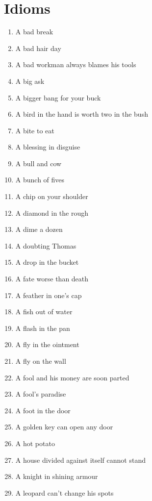 \chapter*{Idioms}


    \begin{enumerate}
        \item  A bad break
        \item  A bad hair day
        \item  A bad workman always blames his tools
        \item  A big ask
        \item  A bigger bang for your buck
        \item  A bird in the hand is worth two in the bush
        \item  A bite to eat
        \item  A blessing in disguise
        \item  A bull and cow
        \item  A bunch of fives
        \item  A chip on your shoulder
        \item  A diamond in the rough
        \item  A dime a dozen
        \item  A doubting Thomas
        \item  A drop in the bucket
        \item  A fate worse than death
        \item  A feather in one's cap
        \item  A fish out of water
        \item  A flash in the pan
        \item  A fly in the ointment
        \item  A fly on the wall
        \item  A fool and his money are soon parted
        \item  A fool's paradise
        \item  A foot in the door
        \item  A golden key can open any door
        \item  A hot potato
        \item  A house divided against itself cannot stand
        \item  A knight in shining armour
        \item  A leopard can't change his spots

\end{enumerate}

